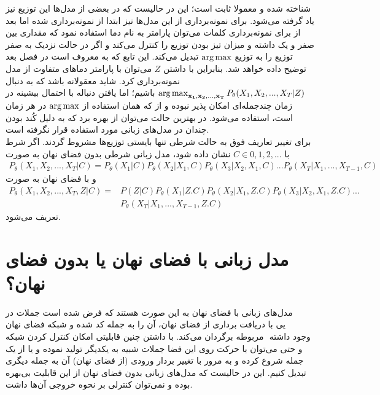شناخته شده و معمولا ثابت است؛ این در حالیست که در بعضی از مدل‌ها این توزیع نیز یاد گرفته می‌شود. برای نمونه‌برداری از این مدل‌ها نیز ابتدا از \priordist{} نمونه‌برداری شده اما بعد از برای نمونه‌برداری کلمات می‌توان پارامتر به نام دما استفاده نمود که مقداری بین صفر و یک داشته و میزان تیز بودن توزیع را کنترل می‌کند و اگر در حالت نزدیک به صفر توزیع را به توزیع $\operatorname*{arg\,max}$ تبدیل می‌کند. این تابع که به  معروف است در فصل بعد توضیح داده خواهد شد. بنابراین با داشتن $Z$ می‌توان با پارامتر دما‌های متفاوت از مدل نمونه‌برداری کرد. شاید معقولانه باشد که به دنبال 
$\operatorname*{arg\,max}_{{\bf x_1}, {\bf x_2}, ..., {\bf x_T}} P_\theta(X_1, X_2, ... , X_T|Z)$
باشیم؛ اما یافتن دنباله با احتمال بیشینه در زمان چندجمله‌ای امکان پذیر نبوده و از \greedydecoding{} که همان استفاده از $\operatorname*{arg\,max}$ در هر زمان است، استفاده می‌شود. در بهترین حالت می‌توان از 
بهره برد که به دلیل کُند بودن چندان در مدل‌های زبانی مورد استفاده قرار نگرفته است.
\\
برای تغییر تعاریف فوق به حالت شرطی تنها بایستی توزیع‌ها مشروط گردند. اگر شرط با $C \in {0,1,2,...}$ نشان داده شود، مدل زبانی شرطی بدون فضای نهان به صورت 
\begin{align}
    P_\theta(X_1, X_2, ... , X_T|C) = P_\theta(X_1|C) P_\theta(X_2|X_1,C) P_\theta(X_3|X_2, X_1,C) ... P_\theta(X_T|X_1, ..., X_{T-1},C)
\end{align}
و با فضای نهان به صورت 
\begin{align}
P_\theta(X_1, X_2, ... , X_T,Z|C) =&P(Z|C) P_\theta(X_1|Z.C) P_\theta(X_2|X_1,Z.C) P_\theta(X_3|X_2, X_1,Z.C) ... \nonumber\\& P_\theta(X_T|X_1, ..., X_{T-1},Z.C)
\end{align}
تعریف می‌شود.
\section{مدل زبانی با فضای نهان یا بدون فضای نهان؟}
مدل‌های زبانی با فضای نهان به این صورت هستند که فرض شده است جملات در فضای نهان ‎کد شده و شبکه ‎\decoder یی با دریافت برداری از فضای نهان، آن را به جمله مربوطه برگردان می‌کند. با داشتن چنین قابلیتی امکان کنترل کردن شبکه ‎\decoder{}‎ وجود داشته و حتی می‌توان با حرکت روی این فضا جملات شبیه به یکدیگر تولید نموده و یا از یک جمله شروع کرده و به مرور با تغییر بردار ورودی (از فضای نهان) آن به جمله دیگری تبدیل کنیم. این در حالیست که مدل‌های زبانی بدون فضای نهان از این قابلیت بی‌بهره بوده و نمی‌توان کنترلی بر نحوه خروجی آن‌ها داشت.

